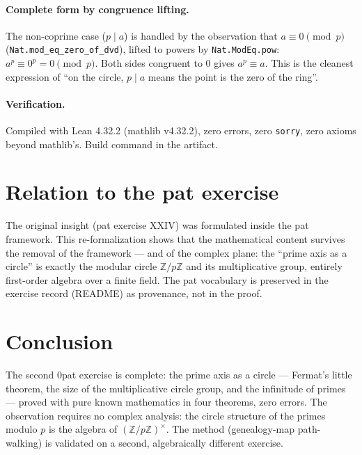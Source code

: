 \documentclass[sigplan,10pt,anonymous,review]{acmart}
\begin{document}
\paragraph{Complete form by congruence lifting.} The non-coprime case
($p \mid a$) is handled by the observation that $a \equiv 0 \pmod p$
(\texttt{Nat.mod\_eq\_zero\_of\_dvd}), lifted to powers by
\texttt{Nat.ModEq.pow}: $a^p \equiv 0^p = 0 \pmod p$. Both sides
congruent to $0$ gives $a^p \equiv a$. This is the cleanest expression of
``on the circle, $p \mid a$ means the point is the zero of the ring''.

\paragraph{Verification.} Compiled with Lean 4.32.2 (mathlib v4.32.2),
zero errors, zero \texttt{sorry}, zero axioms beyond mathlib's. Build
command in the artifact.

\section{Relation to the pat exercise}

The original insight (pat exercise XXIV) was formulated inside the pat
framework. This re-formalization shows that the mathematical content
survives the removal of the framework --- and of the complex plane: the
``prime axis as a circle'' is exactly the modular circle
$\mathbb{Z}/p\mathbb{Z}$ and its multiplicative group, entirely
first-order algebra over a finite field. The pat vocabulary is preserved
in the exercise record (README) as provenance, not in the proof.

\section{Conclusion}

The second 0pat exercise is complete: the prime axis as a circle ---
Fermat's little theorem, the size of the multiplicative circle group, and
the infinitude of primes --- proved with pure known mathematics in four
theorems, zero errors. The observation requires no complex analysis: the
circle structure of the primes modulo $p$ is the algebra of
$(\mathbb{Z}/p\mathbb{Z})^\times$. The method (genealogy-map
path-walking) is validated on a second, algebraically different exercise.



\end{document}
